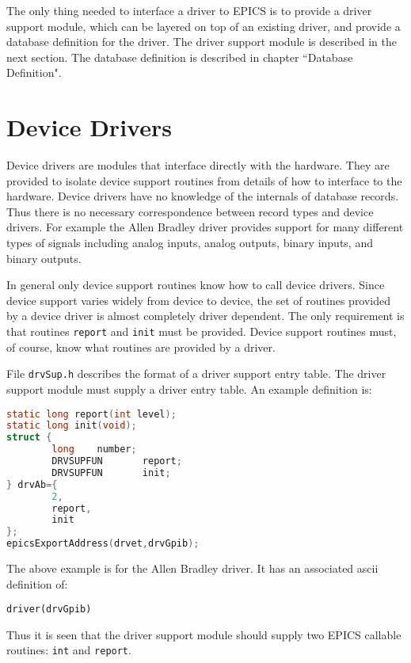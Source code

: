 The only thing needed to interface a driver to EPICS is to provide a driver support module, which can be layered on top of 
an existing driver, and provide a database definition for the driver. The driver support module is described in the next 
section. The database definition is described in chapter ``Database Definition".

\section{Device Drivers}

Device drivers are modules that interface directly with the hardware. They are provided to isolate device support routines 
from details of how to interface to the hardware. Device drivers have no knowledge of the internals of database records. 
Thus there is no necessary correspondence between record types and device drivers. For example the Allen Bradley driver 
provides support for many different types of signals including analog inputs, analog outputs, binary inputs, and binary 
outputs. 

In general only device support routines know how to call device drivers. Since device support varies widely from device 
to device, the set of routines provided by a device driver is almost completely driver dependent. The only requirement is 
that routines \verb|report| and \verb|init| must be provided. Device support routines must, of course, know what routines are 
provided by a driver.

File \verb|drvSup.h| describes the format of a driver support entry table. The driver support module must supply a driver entry 
table. An example definition is:

\begin{lstlisting}[language=C]
static long report(int level);
static long init(void);
struct {
        long    number;
        DRVSUPFUN       report;
        DRVSUPFUN       init;
} drvAb={
        2,
        report,
        init
};
epicsExportAddress(drvet,drvGpib);
\end{lstlisting}

The above example is for the Allen Bradley driver. It has an associated ascii definition of:

\begin{verbatim}
driver(drvGpib)
\end{verbatim}

Thus it is seen that the driver support module should supply two EPICS callable routines: \verb|int| and \verb|report|.

